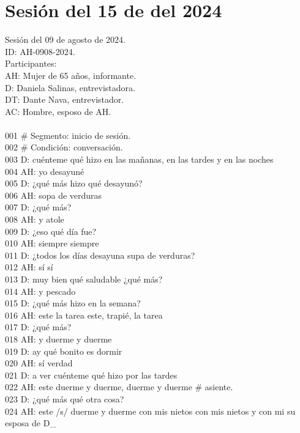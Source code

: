 \section{Sesión del 15 de del 2024}

\noindent
Sesión del 09 de agosto de 2024.\\
ID: AH-0908-2024.\\
Participantes:\\
AH: Mujer de 65 años, informante.\\
D: Daniela Salinas, entrevistadora.\\
DT: Dante Nava, entrevistador.\\
AC: Hombre, esposo de AH.\\
\\
001 \# Segmento: inicio de sesión.\\
002 \# Condición: conversación.\\
003 D: cuénteme qué hizo en las mañanas, en las tardes y en las noches\\
004 AH: yo desayuné\\
005 D: ¿qué más hizo qué desayunó?\\
006 AH: sopa de verduras\\
007 D: ¿qué más?\\
008 AH: y atole\\
009 D: ¿eso qué día fue?\\
010 AH: siempre siempre\\
011 D: ¿todos los días desayuna supa de verduras?\\
012 AH: sí sí\\
013 D: muy bien qué saludable ¿qué más?\\
014 AH: y pescado\\
015 D: ¿qué más hizo en la semana?\\
016 AH: este la tarea este, trapié, la tarea\\
017 D: ¿qué más?\\
018 AH: y duerme y duerme\\
019 D: ay qué bonito es dormir\\
020 AH: sí verdad\\
021 D: a ver cuénteme qué hizo por las tardes\\
022 AH: este duerme y duerme, duerme y duerme \# asiente.\\
023 D: ¿qué más qué otra cosa?\\
024 AH: este /s/ duerme y duerme con mis nietos con mis nietos y con mi su esposa de D\_\\

